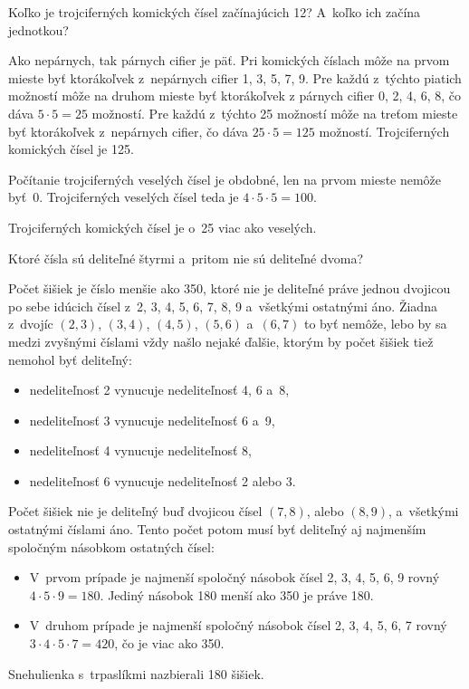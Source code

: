 {%
\napad
Koľko je trojciferných komických čísel začínajúcich 12? A~koľko ich začína jednotkou?

\riesenie
Ako nepárnych, tak párnych cifier je päť.
Pri komických číslach môže na prvom mieste byť ktorákoľvek z~nepárnych cifier 1, 3, 5, 7, 9.
Pre každú z~týchto piatich možností môže na druhom mieste byť ktorákoľvek z párnych cifier 0, 2, 4, 6, 8, čo dáva $5\cdot5=25$ možností.
Pre každú z~týchto 25 možností môže na treťom mieste byť ktorákoľvek z~nepárnych cifier, čo dáva $25\cdot5=125$ možností.
Trojciferných komických čísel je 125.

Počítanie trojciferných veselých čísel je obdobné, len na prvom mieste nemôže byť~0.
Trojciferných veselých čísel teda je $4\cdot5\cdot5=100$.

Trojciferných komických čísel je o~25 viac ako veselých.
}

{%
\napad
Ktoré čísla sú deliteľné štyrmi a~pritom nie sú deliteľné dvoma?

\riesenie
Počet šišiek je číslo menšie ako 350, ktoré nie je deliteľné práve jednou dvojicou po sebe idúcich čísel z~2, 3, 4, 5, 6, 7, 8, 9 a~všetkými ostatnými áno.
Žiadna z~dvojíc $(2,3)$, $(3,4)$, $(4,5)$, $(5,6)$ a~$(6,7)$ to byť nemôže, lebo by sa medzi zvyšnými číslami vždy našlo nejaké ďalšie, ktorým by počet šišiek tiež nemohol byť deliteľný:
\begin{itemize}
\item
nedeliteľnosť 2 vynucuje nedeliteľnosť 4, 6 a~8,
\item
nedeliteľnosť 3 vynucuje nedeliteľnosť 6 a~9,
\item
nedeliteľnosť 4 vynucuje nedeliteľnosť 8,
\item
nedeliteľnosť 6 vynucuje nedeliteľnosť 2 alebo 3.
\end{itemize}

Počet šišiek nie je deliteľný buď dvojicou čísel $(7,8)$, alebo $(8,9)$, a~všetkými ostatnými číslami áno.
Tento počet potom musí byť deliteľný aj najmenším spoločným násobkom ostatných čísel:
\begin{itemize}
\item
V~prvom prípade je najmenší spoločný násobok čísel 2, 3, 4, 5, 6, 9 rovný $4\cdot5\cdot9=180$.
Jediný násobok 180 menší ako 350 je práve 180.
\item
V~druhom prípade je najmenší spoločný násobok čísel 2, 3, 4, 5, 6, 7 rovný $3\cdot4\cdot5\cdot7=420$, čo je viac ako 350.
\end{itemize}

Snehulienka s~trpaslíkmi nazbierali 180 šišiek.
}

